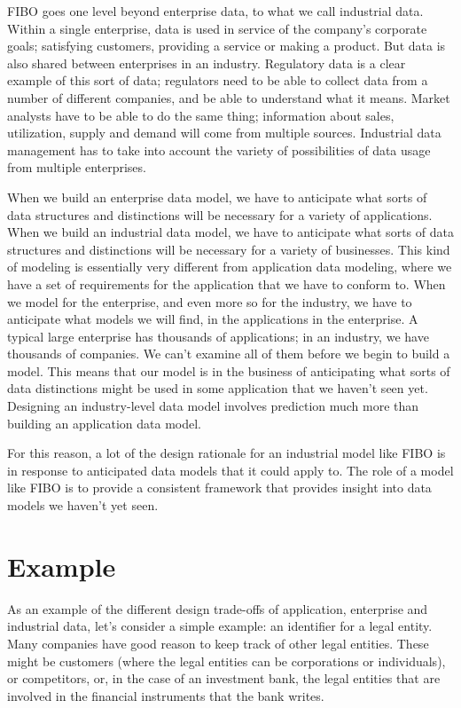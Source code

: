 FIBO goes one level beyond enterprise data, to what we call industrial data.  Within a single enterprise, data is used in service of the company's corporate goals; satisfying customers, providing a service or making a product.  But data is also shared between enterprises in an industry.  Regulatory data is a clear example of this sort of data; regulators need to be able to collect data from a number of different companies, and be able to understand what it means.  Market analysts have to be able to do the same thing; information about sales, utilization, supply and demand will come from multiple sources.  Industrial data management has to take into account the variety of possibilities of data usage from multiple enterprises. 

When we build an enterprise data model, we have to anticipate what sorts of data structures and distinctions will be necessary for a variety of applications.  When we build an industrial data model, we have to anticipate what sorts of data structures and distinctions will be necessary for a variety of businesses.  This kind of modeling is essentially very different from application data modeling, where we have a set of requirements for the application that we have to conform to.  When we model for the enterprise, and even more so for the industry, we have to anticipate what models we will find, in the applications in the enterprise.  A typical large enterprise has thousands of applications; in an industry, we have thousands of companies.  We can't examine all of them before we begin to build a model.  This means that our model is in the business of anticipating what sorts of data distinctions might be used in some application that we haven't seen yet.  Designing an industry-level data model involves prediction much more than building an application data model. 

For this reason, a lot of the design rationale for an industrial model like FIBO is in response to anticipated data models that it could apply to.  The role of a model like FIBO is to provide a consistent framework that provides insight into data models we haven't yet seen.


\section{Example}

As an example of the different design trade-offs of application, enterprise and industrial data, let's consider a simple example: an identifier for a legal entity. Many companies have good reason to keep track of other legal entities.  These might be customers (where the legal entities can be corporations or individuals), or competitors, or, in the case of an investment bank, the legal entities that are involved in the financial instruments that the bank writes.  

